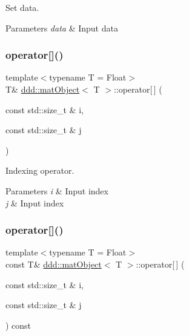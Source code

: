 Set data. 


\begin{DoxyParams}{Parameters}
{\em data} & Input data \\
\hline
\end{DoxyParams}
\mbox{\label{classddd_1_1mat_object_a361b78105da1bb2151f51f674a20d59a}} 
\subsubsection{\texorpdfstring{operator[]()}{operator[]()}\hspace{0.1cm}{\footnotesize\ttfamily [1/2]}}
{\footnotesize\ttfamily template$<$typename T  = Float$>$ \\
T\& \hyperlink{classddd_1_1mat_object}{ddd\+::mat\+Object}$<$ T $>$\+::operator\mbox{[}$\,$\mbox{]} (\begin{DoxyParamCaption}\item[{const std\+::size\+\_\+t \&}]{i,  }\item[{const std\+::size\+\_\+t \&}]{j }\end{DoxyParamCaption})\hspace{0.3cm}{\ttfamily [inline]}}



Indexing operator. 


\begin{DoxyParams}{Parameters}
{\em i} & Input index \\
\hline
{\em j} & Input index \\
\hline
\end{DoxyParams}
\mbox{\label{classddd_1_1mat_object_ae87764e4910b1323233f611c796946a2}} 
\subsubsection{\texorpdfstring{operator[]()}{operator[]()}\hspace{0.1cm}{\footnotesize\ttfamily [2/2]}}
{\footnotesize\ttfamily template$<$typename T  = Float$>$ \\
const T\& \hyperlink{classddd_1_1mat_object}{ddd\+::mat\+Object}$<$ T $>$\+::operator\mbox{[}$\,$\mbox{]} (\begin{DoxyParamCaption}\item[{const std\+::size\+\_\+t \&}]{i,  }\item[{const std\+::size\+\_\+t \&}]{j }\end{DoxyParamCaption}) const\hspace{0.3cm}{\ttfamily [inline]}}



